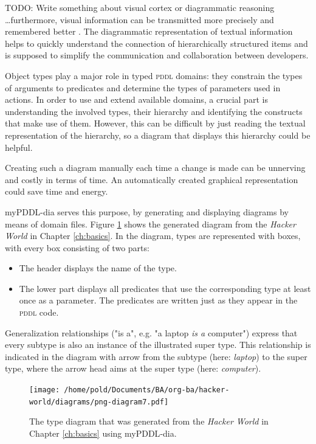 \documentclass[a4paper,12pt]{report}
\newcommand{\mypddl}{\smallerft[0.8]{myPDDL}\xspace}
\newcommand{\pddl}{\textsc{pddl}\xspace}
\newcommand\smallerft[2][0.85]{{\scalefont{#1}#2}}
\begin{document}
TODO: Write something about visual cortex or diagrammatic reasoning \\
\ldots{}furthermore, visual information can be transmitted more precisely
\cite{goolkasian2000pictures} and remembered better
\cite{nelson1976pictorial}. The diagrammatic representation of textual
information helps to quickly understand the connection of
hierarchically structured items \cite{storey2005use} and is supposed
to simplify the communication and collaboration between developers.

Object types play a major role in typed \pddl domains: they constrain
the types of arguments to predicates and determine the types of
parameters used in actions. In order to use and extend available
domains, a crucial part is understanding the involved types, their
hierarchy and identifying the constructs that make use of them.
However, this can be difficult by just reading the textual
representation of the hierarchy, so a diagram that displays this
hierarchy could be helpful.

Creating such a diagram manually each time a change is made can be
unnerving and costly in terms of time. An automatically created
graphical representation could save time and energy.

\mypddl-dia serves this purpose, by generating and displaying diagrams
by means of domain files. Figure \ref{img:auto-gen} shows the generated
diagram from the \emph{Hacker World} in Chapter \ref{ch:basics}. In the diagram,
types are represented with boxes, with every box consisting of two
parts:

\begin{itemize}
\item The header displays the name of the type.
\item The lower part displays all predicates that use the corresponding
type at least once as a parameter. The predicates are written just
as they appear in the \pddl code.
\end{itemize}

Generalization relationships ("is a", e.g. "a laptop \emph{is a} computer")
express that every subtype is also an instance of the illustrated
super type. This relationship is indicated in the diagram with arrow
from the subtype (here: \emph{laptop}) to the super type, where the arrow
head aims at the super type (here: \emph{computer}).

\begin{figure}[htb]
\centering
\texttt{[image: /home/pold/Documents/BA/org-ba/hacker-world/diagrams/png-diagram7.pdf]}
\caption{\label{img:auto-gen}The type diagram that was generated from the \emph{Hacker World} in Chapter \ref{ch:basics} using \mypddl-dia.}
\end{figure}
\end{document}
